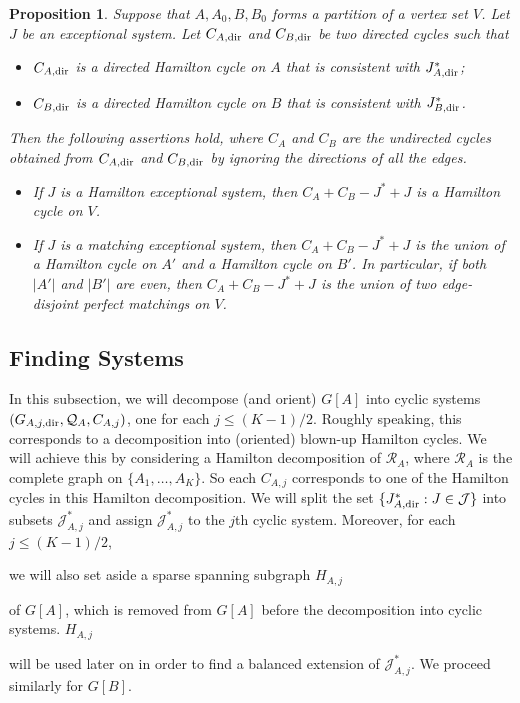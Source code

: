 \documentclass{memo-l}
\newtheorem{prop}[firstthm]{Proposition}
\def\COMMENT#1{}
\numberwithin{section}{chapter}
\numberwithin{equation}{section}
\numberwithin{firstthm}{section}
\numberwithin{figure}{section}
\begin{document}
{\begin{prop} \label{prop:ES2}
Suppose that $A,A_0,B,B_0$ forms a partition of a vertex set $V$.
Let $J$ be an exceptional system. Let $C_{A, {\rm dir}}$ and $C_{B, {\rm dir}}$ be two directed cycles such that 
\begin{itemize}
	\item $C_{A, {\rm dir}}$ is a directed Hamilton cycle on $A$ that is consistent with $J_{A, {\rm dir}}^*$;
	\item $C_{B, {\rm dir}}$ is a directed Hamilton cycle on $B$ that is consistent with $J_{B, {\rm dir}}^*$.
\end{itemize}
Then the following assertions hold, where $C_A$ and $C_B$ are the undirected cycles obtained from $C_{A, {\rm dir}}$
and $C_{B, {\rm dir}}$ by ignoring the directions of all the edges. 
\begin{itemize}
	\item[\rm (i)] If $J$ is a Hamilton exceptional system, then $C_A+C_B - J^* +J$ is a Hamilton cycle on $V$.
		
	\item[\rm (ii)] If $J$ is a  matching exceptional system, then $C_A+C_B - J^* +J$ is the union of a Hamilton cycle on $A'$ and a Hamilton cycle on $B'$.
In particular, if both $|A'|$ and $|B'|$ are even, then $C_A+C_B - J^* +J$ is the union of two edge-disjoint perfect matchings on $V$.
\end{itemize}
\end{prop}


\subsection{Finding Systems}
In this subsection, we will decompose (and orient) $G[A]$ into cyclic systems
$(G_{A,j,{\rm dir}}, \mathcal{Q}_A, C_{A,j})$, one for each $j\le (K-1)/2$.
Roughly speaking, this corresponds to a decomposition into (oriented) blown-up Hamilton cycles.
We will achieve this by considering a Hamilton decomposition of $\mathcal{R}_A$, where 
$\mathcal{R}_A$ is the complete graph on $\{A_1, \dots, A_K \}$. So each $C_{A,j}$ corresponds to one of the
Hamilton cycles in this Hamilton decomposition. We will split the set $\{J^*_{A,{\rm dir}} : J \in \mathcal{J} \}$
into subsets $\mathcal{J}^*_{A,j}$ and assign $\mathcal{J}^*_{A,j}$ to the $j$th cyclic system. Moreover,
for each $j\le (K-1)/2$,%
   \COMMENT{Daniela replaced $j\le (K-1)/2$ by $j\le (K-1)/2$}
we will also set aside a sparse spanning subgraph $H_{A,j}$%
\COMMENT{Andy:replaced $H_j$ with $H_{A,j}$.}
of $G[A]$, which is removed from $G[A]$
before the decomposition into cyclic systems. $H_{A,j}$%
\COMMENT{Andy:replaced $H_j$ with $H_{A,j}$.}
will be used later on in order to
find a balanced extension of $\mathcal{J}^*_{A,j}$. We proceed similarly for $G[B]$.

}
\end{document}
